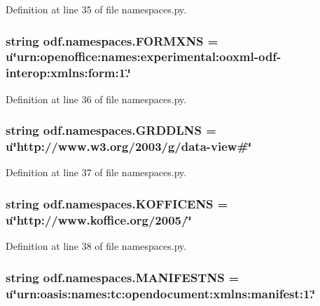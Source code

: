 Definition at line 35 of file namespaces.\+py.

\hypertarget{namespaceodf_1_1namespaces_acf394b4625e52a7730971ed6e8b94a31}{
\subsubsection[{F\+O\+R\+M\+X\+N\+S}]{\setlength{\rightskip}{0pt plus 5cm}string odf.\+namespaces.\+F\+O\+R\+M\+X\+N\+S = u\char`\"{}urn\+:openoffice\+:names\+:experimental\+:ooxml-\/odf-\/interop\+:xmlns\+:form\+:1.\char`\"{}}}\label{namespaceodf_1_1namespaces_acf394b4625e52a7730971ed6e8b94a31}


Definition at line 36 of file namespaces.\+py.

\hypertarget{namespaceodf_1_1namespaces_a22eeeab741b4d282e96b17532f3a0916}{
\subsubsection[{G\+R\+D\+D\+L\+N\+S}]{\setlength{\rightskip}{0pt plus 5cm}string odf.\+namespaces.\+G\+R\+D\+D\+L\+N\+S = u\char`\"{}http\+://www.\+w3.\+org/2003/g/data-\/view\#\char`\"{}}}\label{namespaceodf_1_1namespaces_a22eeeab741b4d282e96b17532f3a0916}


Definition at line 37 of file namespaces.\+py.

\hypertarget{namespaceodf_1_1namespaces_a063735def0cfb8622b678f065f5edc31}{
\subsubsection[{K\+O\+F\+F\+I\+C\+E\+N\+S}]{\setlength{\rightskip}{0pt plus 5cm}string odf.\+namespaces.\+K\+O\+F\+F\+I\+C\+E\+N\+S = u\char`\"{}http\+://www.\+koffice.\+org/2005/\char`\"{}}}\label{namespaceodf_1_1namespaces_a063735def0cfb8622b678f065f5edc31}


Definition at line 38 of file namespaces.\+py.

\hypertarget{namespaceodf_1_1namespaces_a8b9e758fdd0351722b2994c1348b6f30}{
\subsubsection[{M\+A\+N\+I\+F\+E\+S\+T\+N\+S}]{\setlength{\rightskip}{0pt plus 5cm}string odf.\+namespaces.\+M\+A\+N\+I\+F\+E\+S\+T\+N\+S = u\char`\"{}urn\+:oasis\+:names\+:tc\+:opendocument\+:xmlns\+:manifest\+:1.\char`\"{}}}\label{namespaceodf_1_1namespaces_a8b9e758fdd0351722b2994c1348b6f30}


